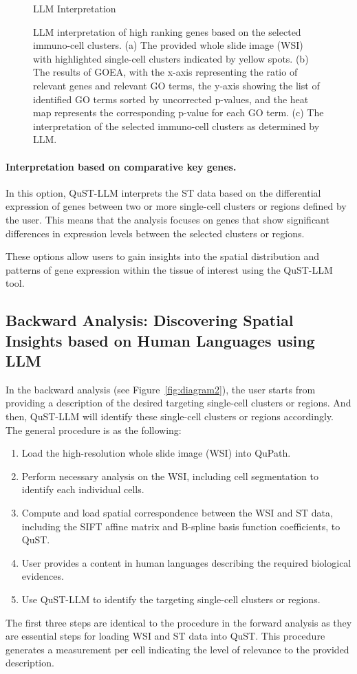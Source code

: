 \documentclass{article}
\begin{document}
\begin{figure}[t]
{\begin{llm}{LLM Interpretation}
	\end{llm}}%
	\caption{LLM interpretation of high ranking genes based on the selected immuno-cell clusters. (a) The provided whole slide image (WSI) with highlighted single-cell clusters indicated by yellow spots. (b) The results of GOEA, with the x-axis representing the ratio of relevant genes and relevant GO terms,  the y-axis showing the list of identified GO terms sorted by uncorrected p-values, and the heat map represents the corresponding p-value for each GO term. (c) The interpretation of the selected immuno-cell clusters as determined by LLM.}%
	\label{fig:result1}
\end{figure}

\paragraph{Interpretation based on comparative key genes.}
In this option, QuST-LLM interprets the ST data based on the differential expression of genes between two or more single-cell clusters or regions defined by the user. This means that the analysis focuses on genes that show significant differences in expression levels between the selected clusters or regions.

These options allow users to gain insights into the spatial distribution and patterns of gene expression within the tissue of interest using the QuST-LLM tool.

\subsection{Backward Analysis: Discovering Spatial Insights based on Human Languages using LLM}

In the backward analysis (see Figure~\ref{fig:diagram2}), the user starts from providing a description of the desired targeting single-cell clusters or regions. And then, QuST-LLM will identify these single-cell clusters or regions accordingly. The general procedure is as the following:
\begin{enumerate}
	\item Load the high-resolution whole slide image (WSI) into QuPath.
	\item Perform necessary analysis on the WSI, including cell segmentation to identify each individual cells.
	\item Compute and load spatial correspondence between the WSI and ST data, including the SIFT affine matrix and B-spline basis function coefficients, to QuST.
	\item User provides a content in human languages describing the required biological evidences. 
	\item Use QuST-LLM to identify the targeting single-cell clusters or regions. 
\end{enumerate}
The first three steps are identical to the procedure in the forward analysis as they are essential steps for loading WSI and ST data into QuST. This procedure generates a measurement per cell indicating the level of relevance to the provided description.
\end{document}
